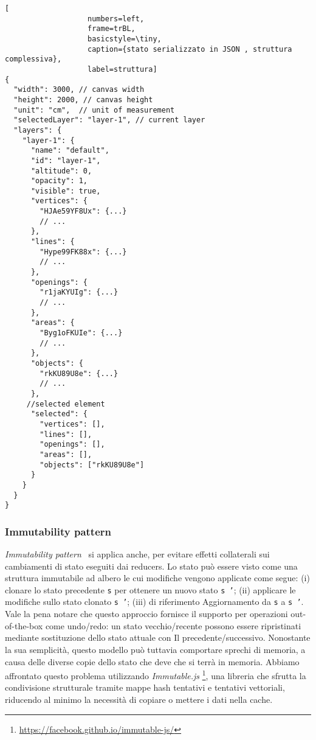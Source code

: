 \begin{lstlisting}[
                   numbers=left,
                   frame=trBL,
                   basicstyle=\tiny,
                   caption={stato serializzato in JSON , struttura complessiva},
                   label=struttura]
{
  "width": 3000, // canvas width
  "height": 2000, // canvas height
  "unit": "cm",  // unit of measurement
  "selectedLayer": "layer-1", // current layer
  "layers": {
    "layer-1": {
      "name": "default",
      "id": "layer-1",
      "altitude": 0,
      "opacity": 1,
      "visible": true,
      "vertices": {
        "HJAe59YF8Ux": {...}
        // ...
      },
      "lines": {
        "Hype99FK88x": {...}
        // ...
      },
      "openings": {
        "r1jaKYUIg": {...}
        // ...
      },
      "areas": {
        "Byg1oFKUIe": {...}
        // ...
      },
      "objects": {
        "rkKU89U8e": {...}
        // ...
      },
     //selected element
      "selected": {
        "vertices": [],
        "lines": [],
        "openings": [],
        "areas": [],
        "objects": ["rkKU89U8e"]
      }
    }
  }
}
\end{lstlisting}
\newpage

\subsubsection*{Immutability pattern}

\emph{Immutability pattern}~\cite{immutability} si applica anche, per evitare effetti collaterali sui cambiamenti di stato
eseguiti dai reducers.
Lo stato può essere visto come una struttura immutabile ad albero le cui modifiche vengono applicate come segue:
(i) clonare lo stato precedente \texttt{s} per ottenere un nuovo stato \texttt{s '};
(ii) applicare le modifiche sullo stato clonato \texttt{s '};
(iii) di riferimento Aggiornamento da \texttt{s} a \texttt{s '}. Vale la pena notare che questo approccio fornisce
il supporto per operazioni out-of-the-box come undo/redo: un stato vecchio/recente possono essere ripristinati mediante sostituzione
dello stato attuale con Il precedente/successivo.
Nonostante la sua semplicità, questo modello può tuttavia comportare sprechi di memoria, a causa delle diverse copie dello
stato che deve che si terrà in memoria. Abbiamo affrontato questo problema utilizzando \emph{Immutable.js}
\footnote{\url{https://facebook.github.io/immutable-js/}}, una libreria che sfrutta la condivisione strutturale tramite
mappe hash tentativi e tentativi vettoriali, riducendo al minimo la necessità di copiare o mettere i dati nella cache.

